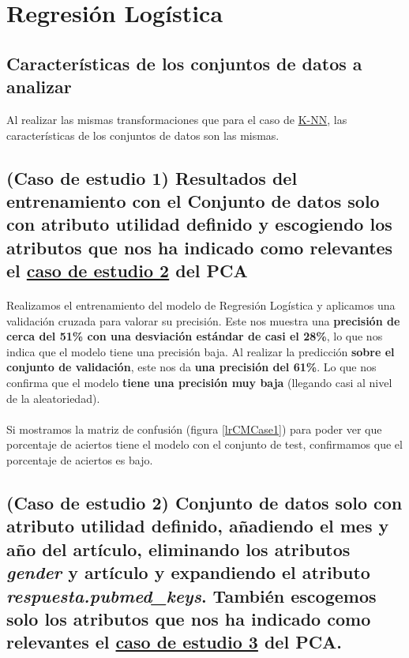 \section{Regresión Logística}
\label{resultados:lr}

\subsection{Características de los conjuntos de datos a analizar}
\label{resultados:lr_caracteristicas}
Al realizar las mismas transformaciones que para el caso de \hyperref[resultados:knn_caracteristicas]{K-NN}, las características de los conjuntos de datos son las mismas.

\subsection{(Caso de estudio 1) Resultados del entrenamiento con el Conjunto de datos solo con atributo utilidad definido y escogiendo los atributos que nos ha indicado como relevantes el \hyperref[result:pca_case2]{caso de estudio 2} del PCA}

\paragraph{}
Realizamos el entrenamiento del modelo de Regresión Logística\cite{ref:lr_def} y aplicamos una validación cruzada\cite{ref:lr_cross_validation} para valorar su precisión. Este nos muestra una \textbf{precisión de cerca del 51\% con una desviación estándar de casi el 28\%}, lo que nos indica que el modelo tiene una precisión baja. Al realizar la predicción \textbf{sobre el conjunto de validación}, este nos da \textbf{una precisión del 61\%}. Lo que nos confirma que el modelo \textbf{tiene una precisión muy baja} (llegando casi al nivel de la aleatoriedad).

\paragraph{}
Si mostramos la matriz de confusión\cite{ref:confusion_matrix} (figura \ref{lrCMCase1}) para poder ver que porcentaje de aciertos tiene el modelo con el conjunto de test, confirmamos que el porcentaje de aciertos es bajo.

\subsection{(Caso de estudio 2) Conjunto de datos solo con atributo utilidad definido, añadiendo el mes y año del artículo, eliminando los atributos \textit{gender} y artículo y expandiendo el atributo \textit{respuesta.pubmed\_keys}. También escogemos solo los atributos que nos ha indicado como relevantes el \hyperref[result:pca_case3]{caso de estudio 3} del PCA.}

